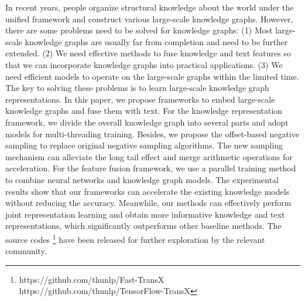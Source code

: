 \begin{eabstract}

   In recent years, people organize structural knowledge about the world under the unified framework and construct various large-scale knowledge graphs. However, there are some problems need to be solved for knowledge graphs: (1) Most large-scale knowledge graphs are usually far from completion and need to be further extended. (2) We need effective methods to fuse knowledge and text features so that we can incorporate knowledge graphs into practical applications. (3) We need efficient models to operate on the large-scale graphs within the limited time. The key to solving these problems is to learn large-scale knowledge graph representations. In this paper, we propose frameworks to embed large-scale knowledge graphs and fuse them with text. For the knowledge representation framework, we divide the overall knowledge graph into several parts and adopt models for multi-threading training. Besides, we propose the offset-based negative sampling to replace original negative sampling algorithms. The new sampling mechanism can alleviate the long tail effect and merge arithmetic operations for acceleration. For the feature fusion framework, we use a parallel training method to combine neural networks and knowledge graph models. The experimental results show that our frameworks can accelerate the existing knowledge models without reducing the accuracy. Meanwhile, our methods can effectively perform joint representation learning and obtain more informative knowledge and text representations, which significantly outperforms other baseline methods. The source codes \footnote{https://github.com/thunlp/Fast-TransX \\ https://github.com/thunlp/TensorFlow-TransX} have been released for further exploration by the relevant community.


\end{eabstract}

